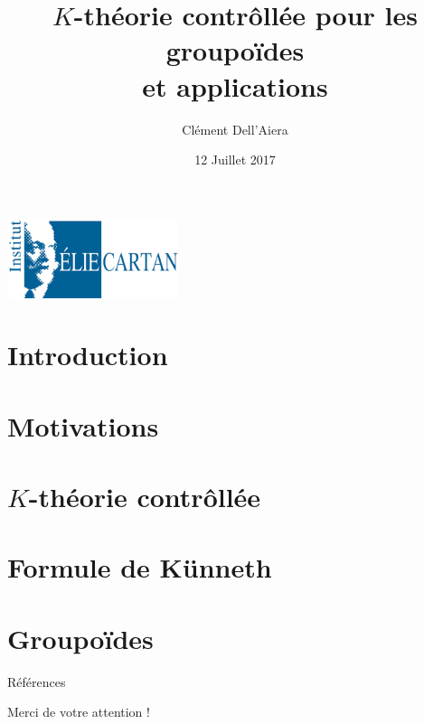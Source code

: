 \documentclass{beamer}
\title[First Steps with SCRATCH]{$K$-théorie contrôllée pour les groupoïdes\\ et applications}
\author{Clément Dell'Aiera}
\institute{IECL}
\date{12 Juillet 2017}
\begin{document}
\begin{frame}
  \titlepage
\begin{center}\includegraphics[width=5cm]{IECL.png}\end{center}
\end{frame}

\begin{frame}
  \tableofcontents
\end{frame}

\section{Introduction}


\section{Motivations}


\section{$K$-théorie contrôllée}


\section{Formule de Künneth}


\section{Groupoïdes}


\begin{frame}{Références}


\end{frame} 

\begin{frame}{}
Merci de votre attention !
\end{frame}
\end{document}
